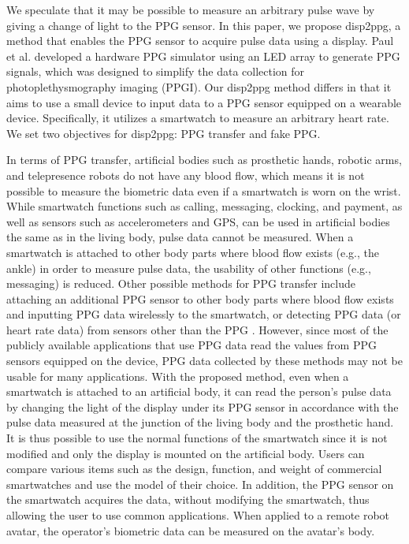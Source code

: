 \documentclass[sigconf]{acmart}
\begin{document}
We speculate that it may be possible to measure an arbitrary pulse wave by giving a change of light to the PPG sensor. In this paper, we propose disp2ppg, a method that enables the PPG sensor to acquire pulse data using a display. Paul et al. \cite{ppg_generator} developed a hardware PPG simulator using an LED array to generate PPG signals, which was designed to simplify the data collection for photoplethysmography imaging (PPGI). Our disp2ppg method differs in that it aims to use a small device to input data to a PPG sensor equipped on a wearable device. Specifically, it utilizes a smartwatch to measure an arbitrary heart rate. We set two objectives for disp2ppg: PPG transfer and fake PPG.\par

In terms of PPG transfer, artificial bodies such as prosthetic hands, robotic arms, and telepresence robots do not have any blood flow, which means it is not possible to measure the biometric data even if a smartwatch is worn on the wrist. While smartwatch functions such as calling, messaging, clocking, and payment, as well as sensors such as accelerometers and GPS, can be used in artificial bodies the same as in the living body, pulse data cannot be measured. When a smartwatch is attached to other body parts where blood flow exists (e.g., the ankle) in order to measure pulse data, the usability of other functions (e.g., messaging) is reduced. Other possible methods for PPG transfer include attaching an additional PPG sensor to other body parts where blood flow exists and inputting PPG data wirelessly to the smartwatch, or detecting PPG data (or heart rate data) from sensors other than the PPG \cite{Biowatch, heart_rate_accelerometer, SeismoTracker}. However, since most of the publicly available applications that use PPG data read the values from PPG sensors equipped on the device, PPG data collected by these methods may not be usable for many applications. With the proposed method, even when a smartwatch is attached to an artificial body, it can read the person's pulse data by changing the light of the display under its PPG sensor in accordance with the pulse data measured at the junction of the living body and the prosthetic hand. It is thus possible to use the normal functions of the smartwatch since it is not modified and only the display is mounted on the artificial body. Users can compare various items such as the design, function, and weight of commercial smartwatches and use the model of their choice. In addition, the PPG sensor on the smartwatch acquires the data, without modifying the smartwatch, thus allowing the user to use common applications. When applied to a remote robot avatar, the operator's biometric data can be measured on the avatar's body.\par
\end{document}
